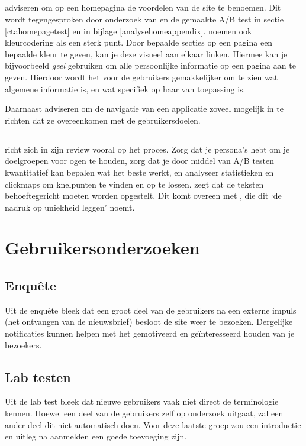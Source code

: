 \documentclass[a4paper, 10pt, pdftex]{report}
\begin{document}
      \subsection{\cite{Hoekman2008}}
        \citeauthor{Hoekman2008} adviseren om op een homepagina de voordelen van de site te benoemen. Dit wordt tegengesproken door onderzoek van \cite{Beenen2004} en de gemaakte A/B test in sectie \ref{ctahomepagetest} en in bijlage \ref{analysehomeappendix}. \citeauthor{Hoekman2008} noemen ook kleurcodering als een sterk punt. Door bepaalde secties op een pagina een bepaalde kleur te geven, kan je deze visueel aan elkaar linken. Hiermee kan je bijvoorbeeld \emph{geel} gebruiken om alle persoonlijke informatie op een pagina aan te geven. Hierdoor wordt het voor de gebruikers gemakkelijker om te zien wat algemene informatie is, en wat specifiek op haar van toepassing is.

        Daarnaast adviseren \citeauthor{Hoekman2008} om de navigatie van een applicatie zoveel mogelijk in te richten dat ze overeenkomen met de gebruikersdoelen.

      \subsection{\cite{Timmerman2008}}
        \citeauthor{Timmerman2008} richt zich in zijn review vooral op het proces. Zorg dat je persona's hebt om je doelgroepen voor ogen te houden, zorg dat je door middel van A/B testen kwantitatief kan bepalen wat het beste werkt, en analyseer statistieken en clickmaps om knelpunten te vinden en op te lossen. \citeauthor{Timmerman2008} zegt dat de teksten behoeftegericht moeten worden opgestelt. Dit komt overeen met \cite{Beenen2004}, die dit `de nadruk op uniekheid leggen' noemt.

  \section{Gebruikersonderzoeken}
    \subsection{Enqu\^ete}
      Uit de enqu\^ete bleek dat een groot deel van de gebruikers na een externe impuls (het ontvangen van de nieuwsbrief) besloot de site weer te bezoeken. Dergelijke notificaties kunnen helpen met het gemotiveerd en ge\"interesseerd houden van je bezoekers.

    \subsection{Lab testen}
      Uit de lab test bleek dat nieuwe gebruikers vaak niet direct de terminologie kennen. Hoewel een deel van de gebruikers zelf op onderzoek uitgaat, zal een ander deel dit niet automatisch doen. Voor deze laatste groep zou een introductie en uitleg na aanmelden een goede toevoeging zijn.
\end{document}
